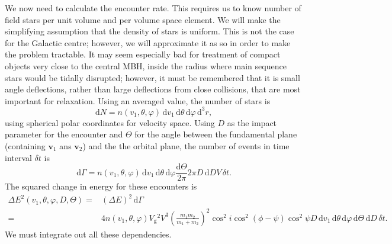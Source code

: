 \documentclass[useAMS,usedcolumn,usegraphicx,usenatbib]{mn2e}
\newcommand{\sub}[1]{\ensuremath{_\mathrm{#1}}}
\newcommand{\dd}{\ensuremath{\mathrm{d}}}
\begin{document}
\begin{onecolumn}
We now need to calculate the encounter rate. This requires us to know number of field stars per unit volume and per volume space element. We will make the simplifying assumption that the density of stars is uniform. This is not the case for the Galactic centre; however, we will approximate it as so in order to make the problem tractable. It may seem especially bad for treatment of compact objects very close to the central MBH, inside the radius where main sequence stars would be tidally disrupted; however, it must be remembered that it is small angle deflections, rather than large deflections from close collisions, that are most important for relaxation. Using an averaged value, the number of stars is
\begin{equation}
\dd N = n(v_1, \theta, \varphi)\,\dd v_1 \,\dd \theta \,\dd \varphi \,\dd^3r,
\end{equation}
using spherical polar coordinates for velocity space. Using $D$ as the impact parameter for the encounter and $\Theta$ for the angle between the fundamental plane (containing $\boldsymbol{v}_1$ ans $\boldsymbol{v}_2$) and the the orbital plane, the number of events in time interval $\delta t$ is
\begin{equation}
\dd \Gamma =  n(v_1, \theta, \varphi)\,\dd v_1 \,\dd \theta \,\dd \varphi \frac{\dd \Theta}{2\pi} 2\pi D \,\dd D V \,\delta t.
\end{equation}
The squared change in energy for these encounters is
\begin{align}
\Delta E^2(v_1,\theta,\varphi,D,\Theta) = {} & \left(\Delta E\right)^2\,\dd \Gamma\\
 = {} & 4 n(v_1,\theta,\varphi)V\sub{g}^2V^3\left(\frac{m_1m_2}{m_1+m_2}\right)^2\cos^2i\cos^2(\phi-\psi)\cos^2\psi D\,\dd v_1\,\dd\theta\,\dd\varphi\,\dd\Theta\,\dd D\,\delta t.
\end{align}
We must integrate out all these dependencies.


\end{onecolumn}
\end{document}
